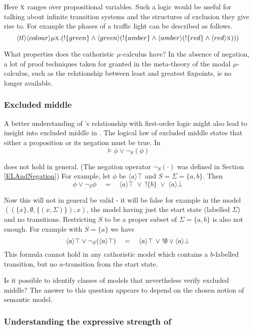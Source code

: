 \NI Here $\text{\textsc{x}}$ ranges over propositional variables.  Such a logic
would be useful for talking about infinite transition systems and the
structures of exclusion they give rise to.  For example the phases of
a traffic light can be described as follows.
\[
   \langle tl \rangle \langle colour \rangle \mu \text{\textsc{x}}.
       (!\{green\} \land \langle green \rangle 
         (!\{amber\} \land \langle amber \rangle 
           (!\{red\} \land \langle red \rangle \text{\textsc{x}})))
\]

 What properties does the
cathoristic $\mu$-calculus have? In the absence of negation, a lot of proof
techniques taken for granted in the meta-theory of the modal
$\mu$-calculus, such as the relationship between least and greatest
fixpoints, is no longer available.

\subsubsection{Excluded middle}

A better understanding of \cathoristic{}'s relationship with first-order
logic might also lead to insight into excluded middle in \cathoristic{}.
The logical law of excluded middle states that either a proposition or
its negation must be true. In \cathoristic{}
\[
\models \phi \lor \neg_S(\phi)
\]

\NI does not hold in general. (The negation operator $\neg_{S}(\cdot)$
was defined in Section \ref{ELAndNegation}) For example, let $\phi$ be
$\langle a \rangle \top$ and $S = \Sigma = \{a, b\}$.  Then
\[
   \phi \lor \neg_{S} \phi 
       \quad=\quad 
   \langle a \rangle \top \; \lor \; ! \{b\} \; \lor \; \langle a \rangle \bot
\]

\NI Now this will not in general be valid - it will be false for
example in the model $((\{x\}, \emptyset, \{(x, \Sigma)\}), x)$, the
model having just the start state (labelled $\Sigma$) and no transitions.
Restricting $S$ to be a proper subset of $\Sigma = \{a, b\}$ is also not
enough. For example with $S = \{a\}$ we have
\[
   \langle a \rangle \top \lor \neg_{S}(\langle a \rangle \top)
      \quad=\quad
   \langle a \rangle \top\ \lor\ !\emptyset \lor \langle a \rangle \bot
\]
This formula cannot hold in any cathoristic model which contains a
$b$-labelled transition, but no $a$-transition from the start state.

Is it possible to identify classes of models that nevertheless verify
excluded middle? The answer to this question appears to depend 
on the chosen notion of semantic model.

\subsubsection{Understanding the expressive strength of \cathoristic{}}

